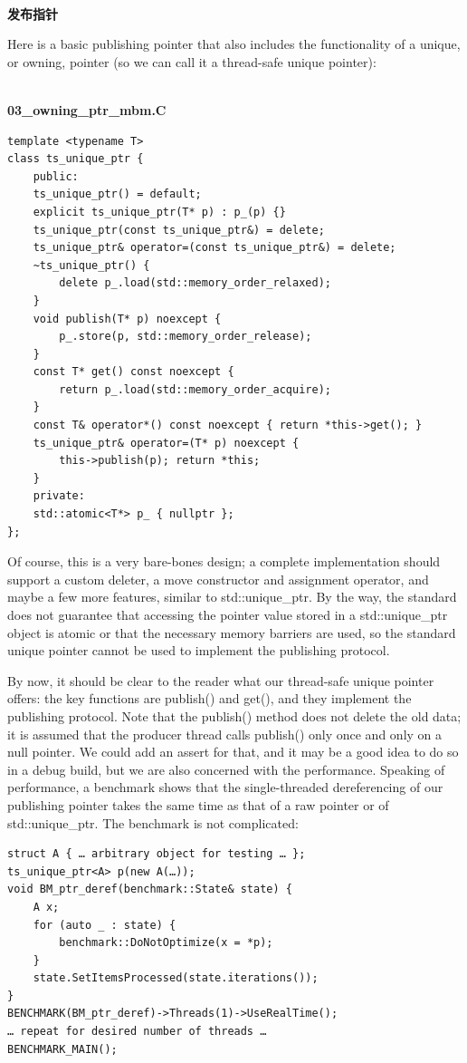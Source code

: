 \hspace*{\fill} \\ %
\noindent
\textbf{发布指针}

Here is a basic publishing pointer that also includes the functionality of a unique, or owning, pointer (so we can call it a thread-safe unique pointer):

\hspace*{\fill} \\ %
\noindent
\textbf{03\_owning\_ptr\_mbm.C}
\begin{lstlisting}[style=styleCXX]
template <typename T>
class ts_unique_ptr {
	public:
	ts_unique_ptr() = default;
	explicit ts_unique_ptr(T* p) : p_(p) {}
	ts_unique_ptr(const ts_unique_ptr&) = delete;
	ts_unique_ptr& operator=(const ts_unique_ptr&) = delete;
	~ts_unique_ptr() {
		delete p_.load(std::memory_order_relaxed);
	}
	void publish(T* p) noexcept {
		p_.store(p, std::memory_order_release);
	}
	const T* get() const noexcept {
		return p_.load(std::memory_order_acquire);
	}
	const T& operator*() const noexcept { return *this->get(); }
	ts_unique_ptr& operator=(T* p) noexcept {
		this->publish(p); return *this;
	}
	private:
	std::atomic<T*> p_ { nullptr };
};
\end{lstlisting}

Of course, this is a very bare-bones design; a complete implementation should support a custom deleter, a move constructor and assignment operator, and maybe a few more features, similar to std::unique\_ptr. By the way, the standard does not guarantee that accessing the pointer value stored in a std::unique\_ptr object is atomic or that the necessary memory barriers are used, so the standard unique pointer cannot be used to implement the publishing protocol.

By now, it should be clear to the reader what our thread-safe unique pointer offers: the key functions are publish() and get(), and they implement the publishing protocol. Note that the publish() method does not delete the old data; it is assumed that the producer thread calls publish() only once and only on a null pointer. We could add an assert for that, and it may be a good idea to do so in a debug build, but we are also concerned with the performance. Speaking of performance, a benchmark shows that the single-threaded dereferencing of our publishing pointer takes the same time as that of a raw pointer or of std::unique\_ptr. The benchmark is not complicated:

\begin{lstlisting}[style=styleCXX]
struct A { … arbitrary object for testing … };
ts_unique_ptr<A> p(new A(…));
void BM_ptr_deref(benchmark::State& state) {
	A x;
	for (auto _ : state) {
		benchmark::DoNotOptimize(x = *p);
	}
	state.SetItemsProcessed(state.iterations());
}
BENCHMARK(BM_ptr_deref)->Threads(1)->UseRealTime();
… repeat for desired number of threads …
BENCHMARK_MAIN();
\end{lstlisting}

